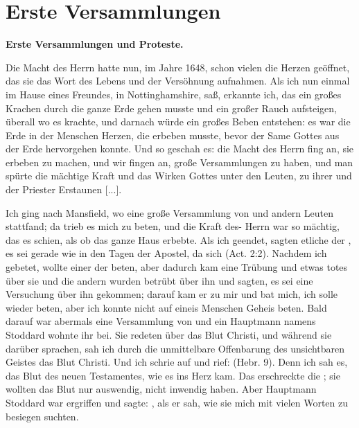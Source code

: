 \chapter[Erste Versammlungen]{Erste Versammlungen}

\begin{center}
\textbf{Erste Versammlungen und Proteste.}
\end{center}

Die Macht des Herrn  hatte nun, im Jahre 1648, schon vielen
die Herzen geöffnet, das sie das Wort des Lebens und der 
Versöhnung aufnahmen. Als ich nun einmal im Hause eines Freundes,
in Nottinghamshire, saß, erkannte ich, das ein großes Krachen
durch die ganze Erde gehen musste und ein großer Rauch 
aufsteigen, überall wo es krachte, und darnach würde ein großes
Beben entstehen: es war die Erde in der Menschen Herzen, die
erbeben musste, bevor der Same Gottes aus der Erde 
hervorgehen konnte. Und so geschah es: die Macht des Herrn  fing an,
sie erbeben zu machen, und wir fingen an, große Versammlungen
zu haben, und man spürte die mächtige Kraft und das Wirken
Gottes unter den Leuten, zu ihrer und der Priester Erstaunen [...].

Ich ging nach Mansfield, wo eine große Versammlung von
 und andern Leuten stattfand; da trieb es mich zu
beten, und die Kraft des- Herrn  war so mächtig, das es schien,
als ob das ganze Haus erbebte. Als ich geendet, sagten etliche
der , es sei gerade wie in den Tagen der Apostel, da
sich  
(Act. 2:2).
Nachdem ich gebetet, wollte einer der  beten, aber
dadurch kam eine Trübung und etwas totes über sie und die
andern  wurden betrübt über ihn und sagten, es sei
eine Versuchung über ihn gekommen; darauf kam er zu mir und
bat mich, ich solle wieder beten, aber ich konnte nicht auf 
eineis Menschen Geheis beten.
Bald darauf war abermals eine Versammlung von 
und ein Hauptmann namens Stoddard wohnte ihr bei. Sie
redeten über das Blut Christi, 
und während sie darüber sprachen,
sah ich durch die unmittelbare Offenbarung des unsichtbaren
Geistes das Blut Christi. Und ich schrie auf und rief:  (Hebr. 9). 
Denn ich sah es, das Blut des neuen Testamentes, 
wie es ins Herz kam. Das
erschreckte die ; sie wollten das Blut nur 
auswendig, nicht inwendig haben. Aber 
Hauptmann Stoddard war ergriffen
und sagte: , als er sah,
wie sie mich mit vielen Worten zu besiegen suchten.


